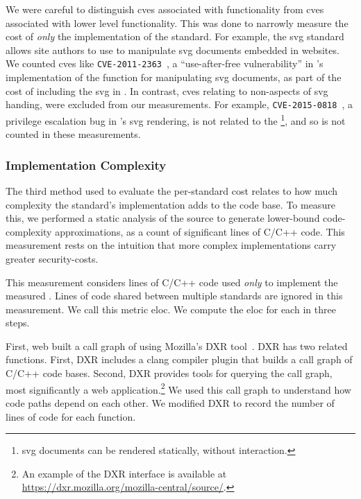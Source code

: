 We were careful to distinguish \gls{cve}s associated with \WAPI functionality
from \gls{cve}s associated with lower level functionality.  This was done to
narrowly measure the cost of \textit{only} the \WAPI implementation of the
standard.  For example, the \gls{svg} standard~\cite{svg2011standard} allows
site authors to use \JS to manipulate \gls{svg} documents embedded in websites.
We counted \gls{cve}s like \texttt{CVE-2011-2363}~\cite{cve_2011_2363}, a
``use-after-free vulnerability'' in \FF's implementation of the \JS function
for manipulating \gls{svg} documents, as part of the cost of including the
\gls{svg} \WAS in \FF.  In contrast, \gls{cve}s relating to non-\WAPI aspects
of \gls{svg} handing, were excluded from our measurements.  For example,
\texttt{CVE-2015-0818}~\cite{cve_2015_0818}, a privilege escalation bug in
\FF's \gls{svg} rendering, is not related to the \WAPI\footnote{\gls{svg}
documents can be rendered statically, without \JS interaction.}, and so is not
counted in these measurements.


\subsubsection{Implementation Complexity}
\label{cost-benefit:methodology:costs-loc}
The third method used to evaluate the per-standard cost relates to
how much complexity the standard's implementation adds to the code base.  To
measure this, we performed a static analysis of the \FF source to generate
lower-bound code-complexity approximations, as a count of significant lines of
C/C++ code.  This measurement rests on the intuition that more complex
implementations carry greater security-costs.

This measurement considers lines of C/C++ code used \emph{only} to implement
the measured \WAS.  Lines of code shared between multiple standards are ignored
in this measurement.  We call this metric \gls{eloc}.  We compute the
\gls{eloc} for each \WAS in three steps.

First, web built a call graph of \FF using Mozilla's DXR tool~\cite{dxr}.
DXR has two related functions. First, DXR includes a clang compiler plugin that
builds a call graph of C/C++ code bases.  Second, DXR provides tools for
querying the call graph, most significantly a web application.\footnote{An
example of the DXR interface is available at
\url{https://dxr.mozilla.org/mozilla-central/source/}.} We used this call graph
to understand how code paths depend on each other.  We modified DXR
to record the number of lines of code for each function.

